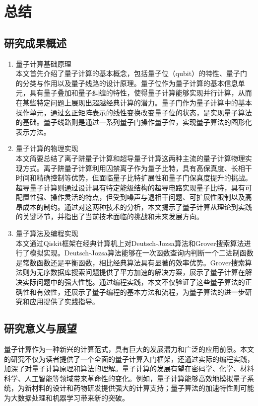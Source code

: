 \section{总结}
\subsection{研究成果概述}

\begin{enumerate}[leftmargin=0pt]
    \item 量子计算基础原理 \\
    本文首先介绍了量子计算的基本概念，包括量子位（qubit）的特性、量子门的分类与作用以及量子线路的设计原理。量子位作为量子计算的基本信息单元，具有量子叠加和量子纠缠的特性，使得量子计算能够实现并行计算，从而在某些特定问题上展现出超越经典计算的潜力。量子门作为量子计算中的基本操作单元，通过幺正矩阵表示的线性变换改变量子位的状态，是实现量子算法的基础。量子线路则是通过一系列量子门操作量子位，实现量子算法的图形化表示方法。
    
    \item 量子计算的物理实现 \\
    本文简要总结了离子阱量子计算和超导量子计算这两种主流的量子计算物理实现方式。离子阱量子计算利用囚禁离子作为量子比特，具有高保真度、长相干时间和精确控制等优势，但面临量子比特扩展性和量子门保真度提升的挑战。超导量子计算则通过设计具有特定能级结构的超导电路实现量子比特，具有可配置性强、操作灵活的特点，但受到噪声与退相干问题、可扩展性限制以及高昂成本的制约。通过对这两种技术的分析，本文揭示了量子计算从理论到实践的关键环节，并指出了当前技术面临的挑战和未来发展方向。
    
    \item 量子算法及编程实现 \\
    本文通过Qiskit框架在经典计算机上对Deutsch-Jozsa算法和Grover搜索算法进行了模拟实现。Deutsch-Jozsa算法能够在一次函数查询内判断一个二进制函数是常数函数还是平衡函数，相比经典算法具有显著的效率优势。Grover搜索算法则为无序数据库搜索问题提供了平方加速的解决方案，展示了量子计算在解决实际问题中的强大性能。通过编程实践，本文不仅验证了这些量子算法的正确性和有效性，还展示了量子编程的基本方法和流程，为量子算法的进一步研究和应用提供了实践指导。
\end{enumerate}

\subsection{研究意义与展望}

量子计算作为一种新兴的计算范式，具有巨大的发展潜力和广泛的应用前景。本文的研究不仅为读者提供了一个全面的量子计算入门框架，还通过实际的编程实践，加深了对量子计算原理和算法的理解。量子计算的发展有望在密码学、化学、材料科学、人工智能等领域带来革命性的变化。例如，量子计算能够高效地模拟量子系统，为新材料的设计和药物研发提供强大的计算支持；量子算法的加速特性则可能为大数据处理和机器学习带来新的突破。

